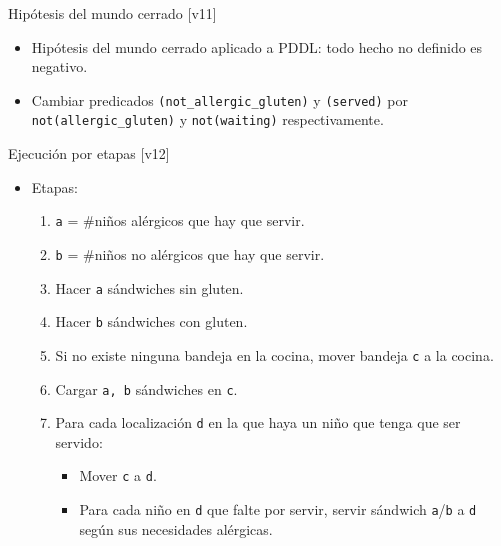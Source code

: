 \documentclass{beamer}
\begin{document}

\begin{frame}{Hipótesis del mundo cerrado [v11]}
    \begin{itemize}
        \item Hipótesis del mundo cerrado aplicado a PDDL: todo hecho no definido es negativo.
        \item Cambiar predicados \texttt{(not\_allergic\_gluten)} y \texttt{(served)} por \texttt{not(allergic\_gluten)} y \texttt{not(waiting)} respectivamente.
        
    \end{itemize}
    
\end{frame}


\begin{frame}{Ejecución por etapas [v12]}
    \begin{itemize}
        \item Etapas:
        \begin{enumerate}
            \item \texttt{a} = #niños alérgicos que hay que servir.
            \item \texttt{b} = #niños no alérgicos que hay que servir.
            \item Hacer \texttt{a} sándwiches sin gluten.
            \item Hacer \texttt{b} sándwiches con gluten.
            \item Si no existe ninguna bandeja en la cocina, mover bandeja \texttt{c} a la cocina.
            \item Cargar \texttt{a, b} sándwiches en \texttt{c}.
            \item Para cada localización \texttt{d} en la que haya un niño que tenga que ser servido:
            \begin{itemize}
                \item Mover \texttt{c} a \texttt{d}.
                \item Para cada niño en \texttt{d} que falte por servir, servir sándwich \texttt{a}/\texttt{b} a \texttt{d} según sus necesidades alérgicas.
            \end{itemize}
        \end{enumerate}
    \end{itemize}
\end{frame}
\end{document}
